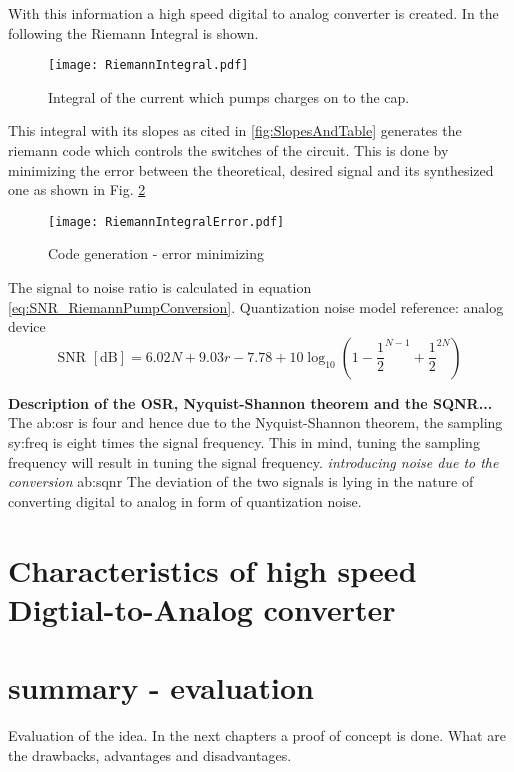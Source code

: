 With this information a high speed digital to analog converter is created. In the following the Riemann Integral is shown.

\begin{figure}[ht]
	\centering
  \texttt{[image: RiemannIntegral.pdf]}
	\caption{Integral of the current which pumps charges on to the cap.}
	\label{fig:RiemannIntegral}
\end{figure}
This integral with its slopes as cited in \ref{fig:SlopesAndTable} generates the riemann code which controls the switches of the circuit. This is done by minimizing the error between the theoretical, desired signal and its synthesized one as shown in Fig. \ref{fig:RiemannIntegralError}
 \begin{figure}[ht]
	\centering
  \texttt{[image: RiemannIntegralError.pdf]}
	\caption{Code generation - error minimizing}
	\label{fig:RiemannIntegralError}
\end{figure}
The signal to noise ratio is calculated in equation \ref{eq:SNR_RiemannPumpConversion}. Quantization noise model {reference: analog device}
\begin{equation}
	\text{SNR } [\si{\dB}] = 6.02N + 9.03r - 7.78 + 10\log_{10}(1 - \frac{1}{2}^{N-1} + \frac{1}{2}^{2N})
	\label{eq:SNR_RiemannPumpConversion}
\end{equation}

\textbf{Description of the OSR, Nyquist-Shannon theorem and the SQNR...}
The \gls{ab:osr} is four and hence due to the Nyquist-Shannon theorem, the sampling \gls{sy:freq} is eight times the signal frequency.
This in mind, tuning the sampling frequency will result in tuning the signal frequency.
\textit{introducing noise due to the conversion}
\gls{ab:sqnr}
The deviation of the two signals is lying in the nature of converting digital to analog in form of quantization noise.

\section{Characteristics of high speed Digtial-to-Analog converter}
\label{ch:characteristics}

\section{summary - evaluation}
Evaluation of the idea. In the next chapters a proof of concept is done. What are the drawbacks, advantages and disadvantages.
